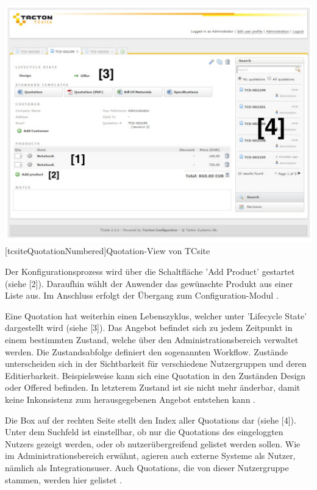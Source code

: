 \documentclass[11pt, a4paper, titlepage, listof=totoc, bibliography=totoc, index=totoc, twoside, openright, headings=normal]{scrreprt}
\begin{document}
\vspace{1em}
\begin{minipage}{\linewidth}
	\centering
	\includegraphics[width=1\linewidth]{Abbildungen/tcsiteQuotationNumbered.pdf}
	[tcsiteQuotationNumbered]{Quotation-View von TCsite}
	\label{fig:tcsiteQuotationNumbered}
\end{minipage}
\vspace{1em}

Der Konfigurationsprozess wird über die Schaltfläche 'Add Product' gestartet (siehe [2]). Daraufhin wählt der Anwender das gewünschte Produkt aus einer Liste aus. Im Anschluss erfolgt der Übergang zum Configuration-Modul \citep{tactonTCsiteReferenceManual}.

Eine Quotation hat weiterhin einen Lebenszyklus, welcher unter 'Lifecycle State' dargestellt wird (siehe [3]). Das Angebot befindet sich zu jedem Zeitpunkt in einem bestimmten Zustand, welche über den Administrationsbereich verwaltet werden. Die Zustandsabfolge definiert den sogenannten \glqq Workflow\grqq{}. Zustände unterscheiden sich in der Sichtbarkeit für verschiedene Nutzergruppen und deren Editierbarkeit. Beispielsweise kann sich eine Quotation in den Zuständen \glqq Design\grqq{} oder \glqq Offered\grqq{} befinden. In letzterem Zustand ist sie nicht mehr änderbar, damit keine Inkonsistenz zum herausgegebenen Angebot entstehen kann \citep{tactonTCsiteReferenceManual}.

Die Box auf der rechten Seite stellt den Index aller Quotations dar (siehe [4]). Unter dem Suchfeld ist einstellbar, ob nur die Quotations des eingeloggten Nutzers gezeigt werden, oder ob nutzerübergreifend gelistet werden sollen. Wie im Administrationsbereich erwähnt, agieren auch externe Systeme als Nutzer, nämlich als Integrationsuser. Auch Quotations, die von dieser Nutzergruppe stammen, werden hier gelistet \citep{tactonTCsiteReferenceManual}.
\end{document}
